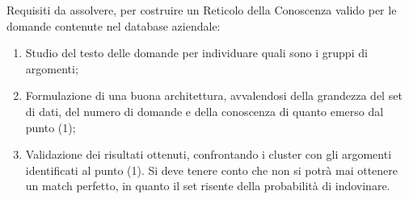 Requisiti da assolvere, per costruire un Reticolo della Conoscenza valido per le domande contenute nel database aziendale:
\begin{enumerate}
\item Studio del testo delle domande per individuare quali sono i gruppi di argomenti;
\item Formulazione di una buona architettura, avvalendosi della grandezza del set di dati, del numero di domande e della conoscenza di quanto emerso dal punto (1);
\item Validazione dei risultati ottenuti, confrontando i cluster con gli argomenti identificati al punto (1). Si deve tenere conto che non si potrà mai ottenere un match perfetto, in quanto il set risente della probabilità di indovinare.
\end{enumerate}


